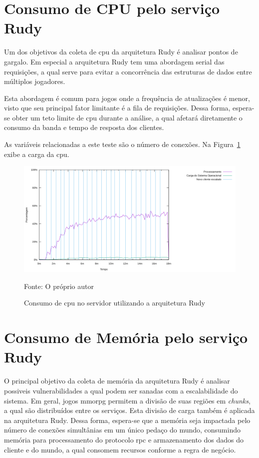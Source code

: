 \section{Consumo de CPU pelo serviço Rudy}

Um dos objetivos da coleta de \ac{cpu} da arquitetura Rudy é analisar pontos de gargalo.
%
Em especial a arquitetura Rudy tem uma abordagem serial das requisições, a qual serve para evitar a concorrência das estruturas de dados entre múltiplos jogadores.

Esta abordagem é comum para jogos onde a frequência de atualizações é menor, visto que seu principal fator limitante é a fila de requisições.
%
Dessa forma, espera-se obter um teto limite de \ac{cpu} durante a análise, a qual afetará diretamente o consumo da banda e tempo de resposta dos clientes.

As variáveis relacionadas a este teste são o número de conexões.
%
Na Figura~\ref{fig:rudy_t4_cpu} exibe a carga da \ac{cpu}.


\begin{figure}[htb!]
    \caption{Consumo de \ac{cpu} no servidor utilizando a arquitetura Rudy}
    \label{fig:rudy_t4_cpu}
    \includegraphics[width=\textwidth]{metricas_rudy_t4/cpu.png}
    \centering
    
    Fonte: O próprio autor
\end{figure}


\section{Consumo de Memória pelo serviço Rudy}

O principal objetivo da coleta de memória da arquitetura Rudy é analisar possiveis vulnerabilidades a qual podem ser sanadas com a escalabilidade do sistema.
%
Em geral, jogos \ac{mmorpg} permitem a divisão de suas regiões em \textit{chunks}, a qual são distribuídos entre os serviços.
%
Esta divisão de carga também é aplicada na arquitetura Rudy.
%
Dessa forma, espera-se que a memória seja impactada pelo número de conexões simultânias em um único pedaço do mundo, consumindo memória para processamento do protocolo \ac{rpc} e armazenamento dos dados do cliente e do mundo, a qual consomem recursos conforme a regra de negócio.

